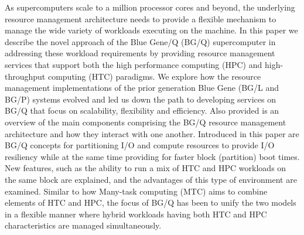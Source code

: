 As supercomputers scale to a million processor cores and beyond, the underlying resource management
architecture needs to provide a flexible mechanism to manage the wide variety of workloads executing on the
machine. In this paper we describe the novel approach of the Blue Gene/Q (BG/Q) supercomputer in addressing
these workload requirements by providing resource management services that support both the high performance
computing (HPC) and high-throughput computing (HTC) paradigms. We explore how the resource management
implementations of the prior generation Blue Gene (BG/L and BG/P) systems evolved and led us down the path to
developing services on BG/Q that focus on scalability, flexibility and efficiency. Also provided is an
overview of the main components comprising the BG/Q resource management architecture and how they interact
with one another. Introduced in this paper are BG/Q concepts for partitioning I/O and compute resources to
provide I/O resiliency while at the same time providing for faster block (partition) boot times. New features, such as
the ability to run a mix of HTC and HPC workloads on the same block are explained, and the advantages of this
type of environment are examined. Similar to how Many-task computing (MTC) \cite{raicu:08} aims to combine elements of HTC
and HPC, the focus of BG/Q has been to unify the two models in a flexible manner where hybrid workloads
having both HTC and HPC characteristics are managed simultaneously.
